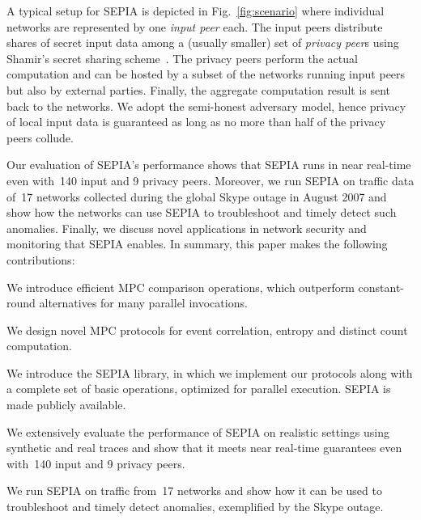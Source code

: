 \documentclass[letterpaper,11pt,onecolumn,titlepage]{article}
\begin{document}
A typical setup for SEPIA is depicted in Fig.~\ref{fig:scenario} where individual networks
are represented by one \emph{input peer} each. The input peers distribute shares of secret
input data among a (usually smaller) set of \emph{privacy peer}s using Shamir's secret sharing scheme~\cite{shamir1979ss}.
The privacy peers perform the actual computation and can be hosted by a subset of the networks running input peers but also 
by external parties. Finally, the aggregate computation result is sent back to the networks.
We adopt the semi-honest adversary model, hence privacy of local input data is guaranteed as long as no more than half of the privacy peers collude.

Our evaluation of SEPIA's performance shows that SEPIA runs in near 
real-time even with~140 input and 9 privacy peers. Moreover, we run SEPIA on traffic data of~17
networks collected during the global Skype outage in August 2007 and
show how the networks can use SEPIA to troubleshoot and
timely detect such anomalies. Finally, we discuss novel applications
in network security and monitoring that SEPIA enables.  In summary,
this paper makes the following contributions:

\vspace{1mm}
\begin{compactenum}

\item We introduce efficient MPC comparison operations, which
outperform constant-round alternatives for many parallel invocations.

\item We design novel MPC protocols for event correlation, entropy and
distinct count computation.

\item We introduce the SEPIA library, in which we implement our
protocols along with a complete set of basic operations, optimized for
parallel execution. SEPIA is made publicly available.

\item We extensively evaluate the performance of SEPIA on realistic
settings using synthetic and real traces and show that it
meets near real-time guarantees even with~140 input and 9
privacy peers.

\item We run SEPIA on traffic from~17 networks and show how it
can be used to troubleshoot and timely detect anomalies, exemplified by the Skype outage. 


\end{compactenum}
\vspace{1mm}
\end{document}
